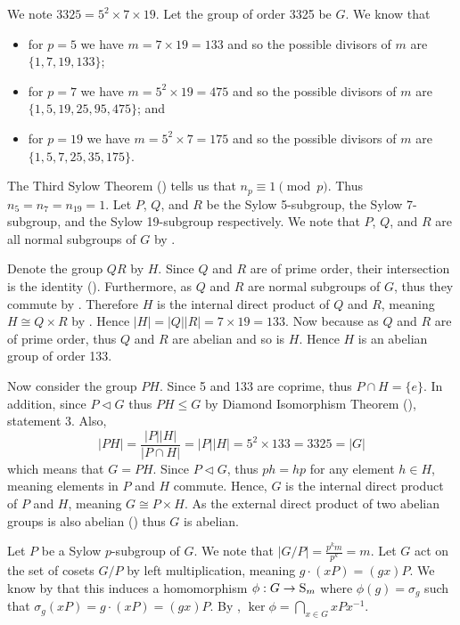 \begin{questions}
    \item We note $3325 = 5^2 \times 7 \times 19$. Let the group of order 3325 be $G$. We know that
    \begin{itemize}
        \item for $p = 5$ we have $m = 7 \times 19 = 133$ and so the possible divisors of $m$ are $\{1, 7, 19, 133\}$;
        \item for $p = 7$ we have $m = 5^2 \times 19 = 475$ and so the possible divisors of $m$ are $\{1, 5, 19, 25, 95, 475\}$; and
        \item for $p = 19$ we have $m = 5^2 \times 7 = 175$ and so the possible divisors of $m$ are $\{1, 5, 7, 25, 35, 175\}$.
    \end{itemize}
    The Third Sylow Theorem () tells us that $n_p \equiv 1 \pmod p$. Thus $n_5 = n_7 = n_{19} = 1$. Let $P$, $Q$, and $R$ be the Sylow 5-subgroup, the Sylow 7-subgroup, and the Sylow 19-subgroup respectively. We note that $P$, $Q$, and $R$ are all normal subgroups of $G$ by .

    Denote the group $QR$ by $H$. Since $Q$ and $R$ are of prime order, their intersection is the identity (). Furthermore, as $Q$ and $R$ are normal subgroups of $G$, thus they commute by . Therefore $H$ is the internal direct product of $Q$ and $R$, meaning $H \cong Q \times R$ by . Hence $|H| = |Q||R| = 7 \times 19 = 133$. Now because as $Q$ and $R$ are of prime order, thus $Q$ and $R$ are abelian and so is $H$. Hence $H$ is an abelian group of order 133.

    Now consider the group $PH$. Since 5 and 133 are coprime, thus $P \cap H = \{e\}$. In addition, since $P \lhd G$ thus $PH \leq G$ by Diamond Isomorphism Theorem (), statement 3. Also,
    \[
        |PH| = \frac{|P||H|}{|P \cap H|} = |P||H| = 5^2 \times 133 = 3325 = |G|
    \]
    which means that $G = PH$. Since $P \lhd G$, thus $ph = hp$ for any element $h \in H$, meaning elements in $P$ and $H$ commute. Hence, $G$ is the internal direct product of $P$ and $H$, meaning $G \cong P \times H$. As the external direct product of two abelian groups is also abelian () thus $G$ is abelian.

    \item Let $P$ be a Sylow $p$-subgroup of $G$. We note that $|G/P| = \frac{p^km}{p^k} = m$. Let $G$ act on the set of cosets $G/P$ by left multiplication, meaning $g\cdot (xP) = (gx)P$. We know by  that this induces a homomorphism $\phi: G \to \mathrm{S}_{m}$ where $\phi(g) = \sigma_g$ such that $\sigma_g(xP) = g\cdot (xP) = (gx)P$. By , $\ker\phi = \bigcap_{x \in G}xPx^{-1}$.


\end{questions}

